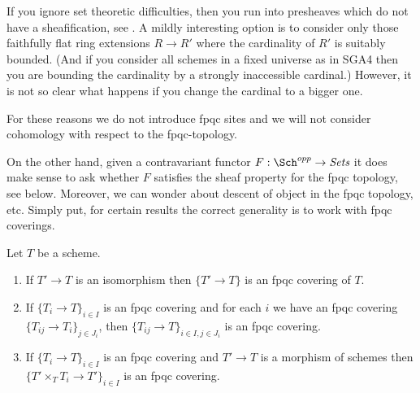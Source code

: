\medskip\noindent
If you ignore set theoretic difficulties, then you run into presheaves
which do not have a sheafification, see
\cite[Theorem 5.5]{Waterhouse-fpqc-sheafification}.
A mildly interesting option is to consider only those faithfully flat ring
extensions $R \to R'$ where the cardinality of $R'$ is suitably bounded.
(And if you consider all schemes in a fixed universe as in SGA4 then you
are bounding the cardinality by a strongly inaccessible cardinal.)
However, it is not so clear what happens if you change the cardinal
to a bigger one.

\medskip\noindent
For these reasons we do not introduce fpqc sites and we will not consider
cohomology with respect to the fpqc-topology.

\medskip\noindent
On the other hand, given a contravariant functor
$F : \Sch^{opp} \to \textit{Sets}$
it does make sense to ask whether $F$ satisfies the sheaf property
for the fpqc topology, see below.
Moreover, we can wonder about descent of object
in the fpqc topology, etc. Simply put, for certain results the correct
generality is to work with fpqc coverings.

\begin{lemma}
\label{lemma-fpqc}
Let $T$ be a scheme.
\begin{enumerate}
\item If $T' \to T$ is an isomorphism then $\{T' \to T\}$
is an fpqc covering of $T$.
\item If $\{T_i \to T\}_{i\in I}$ is an fpqc covering and for each
$i$ we have an fpqc covering $\{T_{ij} \to T_i\}_{j\in J_i}$, then
$\{T_{ij} \to T\}_{i \in I, j\in J_i}$ is an fpqc covering.
\item If $\{T_i \to T\}_{i\in I}$ is an fpqc covering
and $T' \to T$ is a morphism of schemes then
$\{T' \times_T T_i \to T'\}_{i\in I}$ is an fpqc covering.
\end{enumerate}
\end{lemma}


